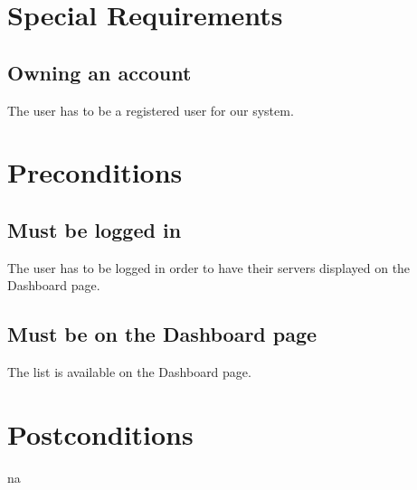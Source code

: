 \documentclass[a4paper,12pt,chapterprefix=false,bibliography=totoc,listof=totoc,book]{scrreprt}
\begin{document}
    \chapter{Special Requirements}
    \section{Owning an account}
    The user has to be a registered user for our system.

    \chapter{Preconditions}
    \section{Must be logged in}
    The user has to be logged in order to have their servers displayed on the Dashboard page.
    \section{Must be on the Dashboard page}
    The list is available on the Dashboard page.
    
    \chapter{Postconditions}
    \gls{na}
\end{document}
